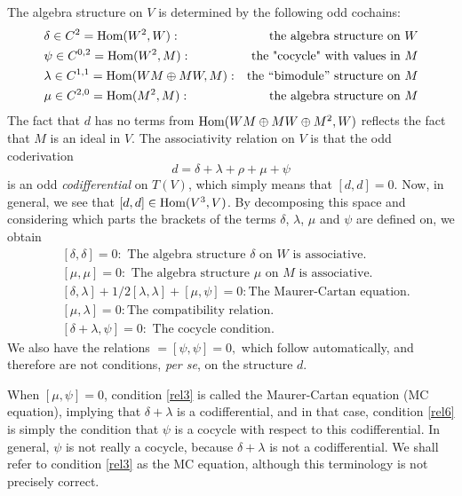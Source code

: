 \documentclass[12pt]{amsart}
\theoremstyle{definition}
\begin{document}
The algebra structure on $V$ is determined by the following odd cochains:
\begin{align*}
&\delta\in C^2={\mbox{\rm Hom}}(W^2,W):& \text{the algebra structure on $W$}\\
&\psi\in C^{0,2}={\mbox{\rm Hom}}(W^2,M):&  \text{the "cocycle" with values in $M$}\\
&\lambda\in C^{1,1}={\mbox{\rm Hom}}(WM\oplus MW,M):&  \text{the ``bimodule''
structure on $M$}\\
&\mu\in C^{2,0}={\mbox{\rm Hom}}(M^2,M):&  \text{the algebra structure on $M$}
\end{align*}
The fact that $d$ has no terms from ${\mbox{\rm Hom}}(WM\oplus MW\oplus M^2,W)$
reflects the fact that $M$ is an ideal in $V$. The associativity
relation on $V$ is that the odd coderivation
$$d=\delta+\lambda+\rho+\mu+\psi$$ is an odd \emph{codifferential} on $T(V)$,
which simply means that $[d,d]=0$. Now, in general, we see that
$[d,d]\in{\mbox{\rm Hom}}(V^3,V)$. By decomposing this space and considering
which parts the brackets of the terms $\delta$, $\lambda$,
$\mu$ and $\psi$ are defined on, we obtain
\begin{align}
\label{rel1} &[\delta,\delta]=0:
\text{ The algebra structure $\delta$ on $W$ is associative.}\\
\label{rel2} &[\mu,\mu]=0:
\text{ The algebra structure $\mu$ on $M$ is associative.}\\
\label{rel3} &
[\delta,\lambda]+1/2[\lambda,\lambda]+[\mu,\psi]=0:
\text{The Maurer-Cartan equation.}\\
\label{rel5} &[\mu,\lambda]=0:\!
\text{The compatibility relation.}\\
\label {rel6} &[\delta+\lambda,\psi]=0: \text{ The cocycle condition.}
\end{align}
We also have the relations
\begin{math}
[\mu,\delta]=[\psi,\psi]=0,
\end{math}
which follow automatically, and therefore are not conditions, {\it
per se}, on the structure $d$.

When $[\mu,\psi]=0$, condition \eqref{rel3} is called the
Maurer-Cartan equation (MC equation), implying that $\delta+\lambda$
is a codifferential, and in that case, condition \eqref{rel6} is
simply the condition that $\psi$ is a cocycle with respect to this
codifferential. In general, $\psi$ is not really a cocycle, because
$\delta+\lambda$ is not a codifferential. We shall refer to
condition \eqref{rel3} as the MC equation, although this
terminology is not precisely correct.
\end{document}
